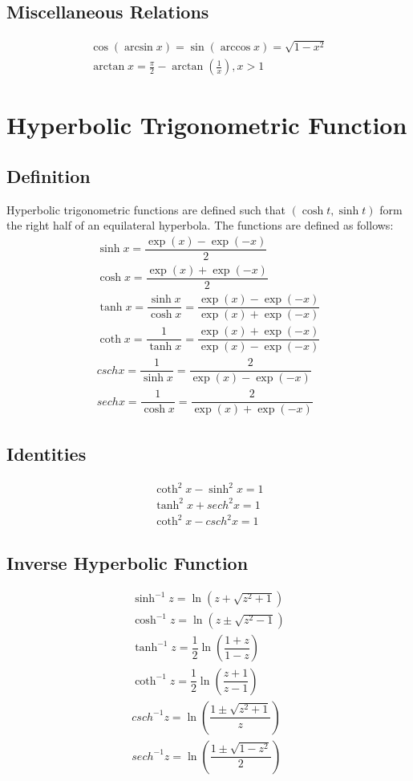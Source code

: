 \documentclass[openany, oneside]{book}
\begin{document}
\section{Miscellaneous Relations}
\begin{align}
\cos(\arcsin x)=\sin(\arccos x)=\sqrt{1-x^2}\\
\arctan x=\frac{\pi}{2}-\arctan\left(\frac{1}{x}\right), x>1
\end{align}

\large{\chapter{Hyperbolic Trigonometric Function}}
\section{Definition}
Hyperbolic trigonometric functions are defined such that $(\cosh t,\sinh t)$ form the right half of an equilateral hyperbola. The functions are defined as follows:
\begin{align}
\sinh x=\dfrac{\exp(x)-\exp(-x)}{2}\\
\cosh x=\dfrac{\exp(x)+\exp(-x)}{2}\\
\tanh x=\dfrac{\sinh x}{\cosh x}=\dfrac{\exp(x)-\exp(-x)}{\exp(x)+\exp(-x)}\\
\coth x=\dfrac{1}{\tanh x}=\dfrac{\exp(x)+\exp(-x)}{\exp(x)-\exp(-x)}\\
csch x=\dfrac{1}{\sinh x}=\dfrac{2}{\exp(x)-\exp(-x)}\\
sech x=\dfrac{1}{\cosh x}=\dfrac{2}{\exp(x)+\exp(-x)}
\end{align}

\section{Identities}
\begin{align}
\coth^2 x-\sinh^2 x=1\\
\tanh^2 x+sech^2 x=1\\
\coth^2 x-csch^2 x=1
\end{align}

\section{Inverse Hyperbolic Function}
\begin{align}
\sinh^{-1} z= \ln(z+\sqrt{z^2+1})\\
\cosh^{-1} z= \ln(z\pm\sqrt{z^2-1})\\
\tanh^{-1} z= \dfrac{1}{2}\ln\left(\dfrac{1+z}{1-z}\right)\\
\coth^{-1} z= \dfrac{1}{2}\ln\left(\dfrac{z+1}{z-1}\right)\\
csch^{-1} z= \ln\left(\dfrac{1\pm\sqrt{z^2+1}}{z}\right)\\
sech^{-1} z= \ln\left(\dfrac{1\pm\sqrt{1-z^2}}{2}\right)
\end{align}
\end{document}
